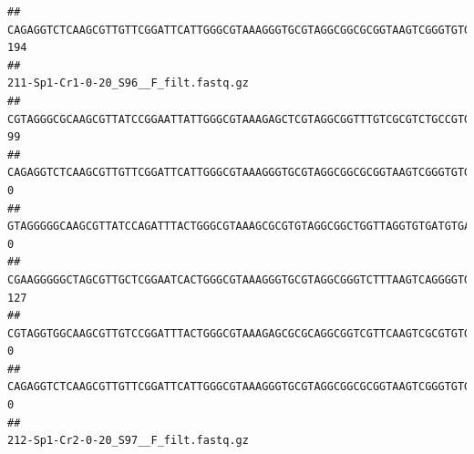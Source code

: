 \documentclass[]{article}
\begin{document}
\begin{verbatim}
## CAGAGGTCTCAAGCGTTGTTCGGATTCATTGGGCGTAAAGGGTGCGTAGGCGGCGCGGTAAGTCGGGTGTGAAATCTCGGGGCTTAACTCCGAAACTGCATTCGATACTGCCGTGCTTGAGGACTGGAGAGGAGACTGGAATTTACGGTGTAGCGGTGAAATGCGTAGATATCGTAAGGAAGACCAGTGGCGAAGGCGGGTCTCTGGACAGTTCCTGACGCTGAGGCACGAAGGCCAGGGGAGCAAACG                                     194
##                                                                                                                                                                                                                                                           211-Sp1-Cr1-0-20_S96__F_filt.fastq.gz
## CGTAGGGCGCAAGCGTTATCCGGAATTATTGGGCGTAAAGAGCTCGTAGGCGGTTTGTCGCGTCTGCCGTGAAAGTCCGGGGCTCAACTCCGGATCTGCGGTGGGTACGGGCAGACTAGAGTGATGTAGGGGAGACTGGAATTCCTGGTGTAGCGGTGAAATGCGCAGATATCAGGAGGAACACCGATGGCGAAGGCAGGTCTCTGGGCATTAACTGACGCTGAGGAGCGAAAGCATGGGGAGCGAACA                                    99
## CAGAGGTCTCAAGCGTTGTTCGGATTCATTGGGCGTAAAGGGTGCGTAGGCGGCGCGGTAAGTCGGGTGTGAAATCTCGGAGCTTAACTCCGAAACTGCATTCGATACTGCCGTGCTTGAGGACTGGAGAGGAGACTGGAATTTACGGTGTAGCGGTGAAATGCGTAGATATCGTAAGGAAGACCAGTGGCGAAGGCGGGTCTCTGGACAGTTCCTGACGCTGAGGCACGAAGGCCAGGGGAGCAAACG                                     0
## GTAGGGGGCAAGCGTTATCCAGATTTACTGGGCGTAAAGCGCGTGTAGGCGGCTGGTTAGGTGTGATGTGAAATCTTCCGGCTCAACCGGAAAACTGCATTGCAAACCGGCCTGGCTAGAGTGCAGGAGAGGGAAGCGGAATTCCAGGTGTAGCGGTGAAATGCGTAGATATCTGGAGGAACACCAGTGGCGAAGGCGGCTTCCTGGCCTGCAACTGACGCTGAGACGCGAAAGCGTGGGGAGCGAAC                                      0
## CGAAGGGGGCTAGCGTTGCTCGGAATCACTGGGCGTAAAGGGTGCGTAGGCGGGTCTTTAAGTCAGGGGTGAAATCCTGGAGCTCAACTCCAGAACTGCCTTTGATACTGAAGATCTTGAGTTCGGGAGAGGTGAGTGGAACTGCGAGTGTAGAGGTGAAATTCGTAGATATTCGCAAGAACACCAGTGGCGAAGGCGGCTCACTGGCCCGATACTGACGCTGAGGCACGAAAGCGTGGGGAGCAAACA                                   127
## CGTAGGTGGCAAGCGTTGTCCGGATTTACTGGGCGTAAAGAGCGCGCAGGCGGTCGTTCAAGTCGCGTGTGAAAGCCCCCGGCTCAACTGGGGAGGGTCACGCGATACTGATCGACTCGAAGGCAGGAGAGGGTAGTGGAATTCCCGGTGTAGTGGTGAAATGCGTAGATATCGGGAGGAACACCAGTGGCGAAGGCGACTACCTGGCCTGTTCTTGACGCTGAGGCGCGAAAGCTAGGGGAGCAAACG                                     0
## CAGAGGTCTCAAGCGTTGTTCGGATTCATTGGGCGTAAAGGGTGCGTAGGCGGCGCGGTAAGTCGGGTGTGAAATCTCGGGGCTTAACTCCGAAACTGCATTCGATACTGCCGTGCTTGAGGACTGGAGAGGAGACTGGAATTTACGGTGTAGCGGTGAAATGCGTAGATATCGTAAGGAAGACCAGTGGCGAAGGCGGGTCTCTGGACAGTTCCTGACGCTGAGGCACGAAGGCCAGGGGAGCAAACG                                     0
##                                                                                                                                                                                                                                                           212-Sp1-Cr2-0-20_S97__F_filt.fastq.gz

\end{verbatim}
\end{document}
